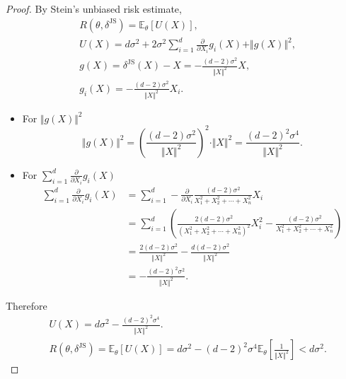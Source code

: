\documentclass[a4paper]{article}
\begin{document}
\begin{proof}
	By Stein's unbiased risk estimate,
	\begin{equation}
		\begin{aligned}
			& R(\theta,\delta^{\text{JS}}) = \mathbb{E}_\theta[U(X)], \\
			& U(X) = d\sigma^2 + 2\sigma^2\sum\limits_{i=1}^d\frac{\partial}{\partial X_i}g_i(X)+\Vert g(X) \Vert^2, \\
			& g(X) = \delta^{\text{JS}}(X) - X = -\frac{(d-2)\sigma^2}{\Vert X \Vert ^2}X, \\
			& g_i(X) = -\frac{(d-2)\sigma^2}{\Vert X \Vert ^2}X_i.
		\end{aligned}
	\end{equation}
	\begin{itemize}
		\item For $\Vert g(X) \Vert^2$
		\begin{equation}
			\Vert g(X) \Vert^2 = \left(\frac{(d-2)\sigma^2}{\Vert X \Vert ^2}\right)^2 \cdot \Vert X \Vert ^2 = \frac{(d-2)^2\sigma^4}{\Vert X \Vert ^2}.
		\end{equation}
		\item For $\sum\limits_{i=1}^d\frac{\partial}{\partial X_i}g_i(X)$
		\begin{equation}
			\begin{aligned}
				\sum\limits_{i=1}^d\frac{\partial}{\partial X_i}g_i(X) &= \sum\limits_{i=1}^d-\frac{\partial}{\partial X_i} \frac{(d-2)\sigma^2}{X_1^2 + X_2^2 + \cdots + X_n^2}X_i \\
				&= \sum\limits_{i=1}^d\left(\frac{2(d-2)\sigma^2}{(X_1^2 + X_2^2 + \cdots + X_n^2)^2}X_i^2 - \frac{(d-2)\sigma^2}{X_1^2 + X_2^2 + \cdots + X_n^2}\right) \\
				&= \frac{2(d-2)\sigma^2}{\Vert X \Vert ^2} - \frac{d(d-2)\sigma^2}{\Vert X \Vert ^2} \\
				&= - \frac{(d-2)^2\sigma^2}{\Vert X \Vert ^2}.
			\end{aligned}
		\end{equation}
	\end{itemize}
	Therefore
	\begin{equation}
		\begin{aligned}
			& U(X) = d\sigma^2  - \frac{(d-2)^2\sigma^4}{\Vert X \Vert ^2}. \\
			& R(\theta,\delta^{\text{JS}}) = \mathbb{E}_\theta[U(X)] = d\sigma^2  - (d-2)^2\sigma^4 \mathbb{E}_\theta\left[\frac{1}{\Vert X \Vert ^2}\right] < d\sigma^2.
		\end{aligned}
	\end{equation}

\end{proof}
\end{document}
